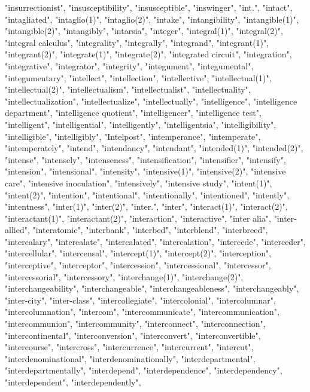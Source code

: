 "insurrectionist",
"insusceptibility",
"insusceptible",
"inswinger",
"int.",
"intact",
"intagliated",
"intaglio(1)",
"intaglio(2)",
"intake",
"intangibility",
"intangible(1)",
"intangible(2)",
"intangibly",
"intarsia",
"integer",
"integral(1)",
"integral(2)",
"integral calculus",
"integrality",
"integrally",
"integrand",
"integrant(1)",
"integrant(2)",
"integrate(1)",
"integrate(2)",
"integrated circuit",
"integration",
"integrative",
"integrator",
"integrity",
"integument",
"integumental",
"integumentary",
"intellect",
"intellection",
"intellective",
"intellectual(1)",
"intellectual(2)",
"intellectualism",
"intellectualist",
"intellectuality",
"intellectualization",
"intellectualize",
"intellectually",
"intelligence",
"intelligence department",
"intelligence quotient",
"intelligencer",
"intelligence test",
"intelligent",
"intelligential",
"intelligently",
"intelligentsia",
"intelligibility",
"intelligible",
"intelligibly",
"Intelpost",
"intemperance",
"intemperate",
"intemperately",
"intend",
"intendancy",
"intendant",
"intended(1)",
"intended(2)",
"intense",
"intensely",
"intenseness",
"intensification",
"intensifier",
"intensify",
"intension",
"intensional",
"intensity",
"intensive(1)",
"intensive(2)",
"intensive care",
"intensive inoculation",
"intensively",
"intensive study",
"intent(1)",
"intent(2)",
"intention",
"intentional",
"intentionally",
"intentioned",
"intently",
"intentness",
"inter(1)",
"inter(2)",
"inter.",
"inter",
"interact(1)",
"interact(2)",
"interactant(1)",
"interactant(2)",
"interaction",
"interactive",
"inter alia",
"inter-allied",
"interatomic",
"interbank",
"interbed",
"interblend",
"interbreed",
"intercalary",
"intercalate",
"intercalated",
"intercalation",
"intercede",
"interceder",
"intercellular",
"intercensal",
"intercept(1)",
"intercept(2)",
"interception",
"interceptive",
"interceptor",
"intercession",
"intercessional",
"intercessor",
"intercessorial",
"intercessory",
"interchange(1)",
"interchange(2)",
"interchangeability",
"interchangeable",
"interchangeableness",
"interchangeably",
"inter-city",
"inter-class",
"intercollegiate",
"intercolonial",
"intercolumnar",
"intercolumnation",
"intercom",
"intercommunicate",
"intercommunication",
"intercommunion",
"intercommunity",
"interconnect",
"interconnection",
"intercontinental",
"interconversion",
"interconvert",
"interconvertible",
"intercourse",
"intercross",
"intercurrence",
"intercurrent",
"intercut",
"interdenominational",
"interdenominationally",
"interdepartmental",
"interdepartmentally",
"interdepend",
"interdependence",
"interdependency",
"interdependent",
"interdependently",
